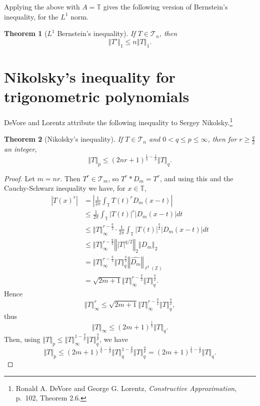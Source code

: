 \documentclass{article}
\newcommand{\norm}[1]{\left\Vert #1 \right\Vert}
\newtheorem{theorem}{Theorem}
\theoremstyle{definition}
\begin{document}
Applying the above with $A=\mathbb{T}$ gives the following version of Bernstein's inequality, for
the $L^1$ norm.

\begin{theorem}[$L^1$ Bernstein's inequality]
If $T \in \mathscr{T}_n$, then 
\[
\norm{T'}_1 \leq n \norm{T}_1.
\]
\end{theorem}


\section{Nikolsky's inequality for trigonometric polynomials}
DeVore and Lorentz attribute the following inequality to Sergey Nikolsky.\footnote{Ronald A. DeVore and George G. Lorentz,
{\em Constructive Approximation}, p.~102, Theorem 2.6.}

\begin{theorem}[Nikolsky's inequality]
If $T \in \mathscr{T}_n$ and $0<q \leq p \leq \infty$, then for $r \geq \frac{q}{2}$ an integer,
\[
\norm{T}_p \leq (2nr+1)^{\frac{1}{q}-\frac{1}{p}} \norm{T}_q.
\]
\end{theorem}
\begin{proof}
Let $m=nr$. Then $T^r \in \mathscr{T}_m$, so $T^r * D_m = T^r$, and using this and the Cauchy-Schwarz inequality we have,
for $x \in \mathbb{T}$,
\begin{align*}
|T(x)^r|&= \left| \frac{1}{2\pi} \int_{\mathbb{T}} T(t)^r D_m(x-t)\right|\\
&\leq  \frac{1}{2\pi} \int_{\mathbb{T}} |T(t)|^r |D_m(x-t)| dt\\
&\leq  \norm{T}_\infty^{r-\frac{q}{2}}  \cdot \frac{1}{2\pi} \int_{\mathbb{T}}
|T(t)|^{\frac{q}{2}} |D_m(x-t)| dt\\
&\leq   \norm{T}_\infty^{r-\frac{q}{2}} \norm{ |T|^{q/2}}_2 \norm{D_m}_2\\
&= \norm{T}_\infty^{r-\frac{q}{2}} \norm{T}_q^{\frac{q}{2}} \norm{\widehat{D_m}}_{\ell^2(\mathbb{Z})}\\
&=\sqrt{2m+1}  \norm{T}_\infty^{r-\frac{q}{2}} \norm{T}_q^{\frac{q}{2}}.
\end{align*}
Hence
\[
\norm{T}_\infty^r \leq \sqrt{2m+1}  \norm{T}_\infty^{r-\frac{q}{2}} \norm{T}_q^{\frac{q}{2}},
\]
thus
\[
\norm{T}_\infty \leq  (2m+1)^{\frac{1}{q}}  \norm{T}_q.
\]
Then, using
$\norm{T}_p \leq \norm{T}_\infty^{1-\frac{q}{p}} \norm{T}_q^{\frac{q}{p}}$,
we have
\[
\norm{T}_p \leq (2m+1)^{\frac{1}{q}-\frac{1}{p}} \norm{T}_q^{1-\frac{q}{p}}
\norm{T}_q^{\frac{q}{p}}
=(2m+1)^{\frac{1}{q}-\frac{1}{p}} \norm{T}_q.
\]
\end{proof}
\end{document}

